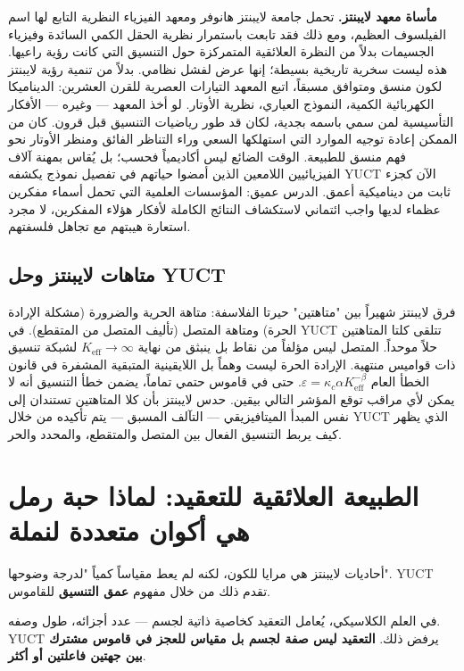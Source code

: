 \documentclass[12pt,a4paper]{article}
\begin{document}
	\textbf{مأساة معهد لايبنتز.} تحمل جامعة لايبنتز هانوفر ومعهد الفيزياء النظرية التابع لها اسم الفيلسوف العظيم، ومع ذلك فقد تابعت باستمرار نظرية الحقل الكمي السائدة وفيزياء الجسيمات بدلاً من النظرة العلائقية المتمركزة حول التنسيق التي كانت رؤية راعيها. هذه ليست سخرية تاريخية بسيطة؛ إنها عرض لفشل نظامي. بدلاً من تنمية رؤية لايبنتز لكون منسق ومتوافق مسبقاً، اتبع المعهد التيارات العصرية للقرن العشرين: الديناميكا الكهربائية الكمية، النموذج العياري، نظرية الأوتار. لو أخذ المعهد — وغيره — الأفكار التأسيسية لمن سمي باسمه بجدية، لكان قد طور رياضيات التنسيق قبل قرون. كان من الممكن إعادة توجيه الموارد التي استهلكها السعي وراء التناظر الفائق ومنظر الأوتار نحو فهم منسق للطبيعة. الوقت الضائع ليس أكاديمياً فحسب؛ بل يُقاس بمهنة آلاف الفيزيائيين اللامعين الذين أمضوا حياتهم في تفصيل نموذج يكشفه YUCT الآن كجزء ثابت من ديناميكية أعمق. الدرس عميق: المؤسسات العلمية التي تحمل أسماء مفكرين عظماء لديها واجب ائتماني لاستكشاف النتائج الكاملة لأفكار هؤلاء المفكرين، لا مجرد استعارة هيبتهم مع تجاهل فلسفتهم.
	
	\subsection{متاهات لايبنتز وحل YUCT}
	
	فرق لايبنتز شهيراً بين "متاهتين" حيرتا الفلاسفة: متاهة الحرية والضرورة (مشكلة الإرادة الحرة) ومتاهة المتصل (تأليف المتصل من المتقطع). في YUCT تتلقى كلتا المتاهتين حلاً موحداً. المتصل ليس مؤلفاً من نقاط بل ينبثق من نهاية \(K_{\mathrm{eff}} \to \infty\) لشبكة تنسيق ذات قواميس منتهية. الإرادة الحرة ليست وهماً بل اللايقينية المتبقية المشفرة في قانون الخطأ العام \(\varepsilon = \kappa_c \alpha K_{\mathrm{eff}}^{-\beta}\). حتى في قاموس حتمي تماماً، يضمن خطأ التنسيق أنه لا يمكن لأي مراقب توقع المؤشر التالي بيقين. حدس لايبنتز بأن كلا المتاهتين تستندان إلى نفس المبدأ الميتافيزيقي — التآلف المسبق — يتم تأكيده من خلال YUCT الذي يظهر كيف يربط التنسيق الفعال بين المتصل والمتقطع، والمحدد والحر.
	
	\section{الطبيعة العلائقية للتعقيد: لماذا حبة رمل هي أكوان متعددة لنملة}
	\label{sec:relational-complexity}
	
	أحاديات لايبنتز هي مرايا للكون، لكنه لم يعط مقياساً كمياً "لدرجة وضوحها". YUCT تقدم ذلك من خلال مفهوم \textbf{عمق التنسيق} للقاموس.
	
	في العلم الكلاسيكي، يُعامل التعقيد كخاصية ذاتية لجسم — عدد أجزائه، طول وصفه. YUCT يرفض ذلك. \textbf{التعقيد ليس صفة لجسم بل مقياس للعجز في قاموس مشترك بين جهتين فاعلتين أو أكثر}.
	
\end{document}
